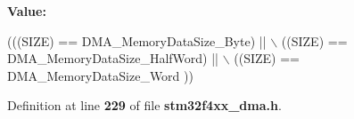 {\bfseries Value\+:}
\begin{DoxyCode}
(((SIZE) == DMA_MemoryDataSize_Byte)  || \(\backslash\)
                                       ((SIZE) == DMA_MemoryDataSize_HalfWord) || \(\backslash\)
                                       ((SIZE) == DMA_MemoryDataSize_Word ))
\end{DoxyCode}


Definition at line \textbf{ 229} of file \textbf{ stm32f4xx\+\_\+dma.\+h}.

